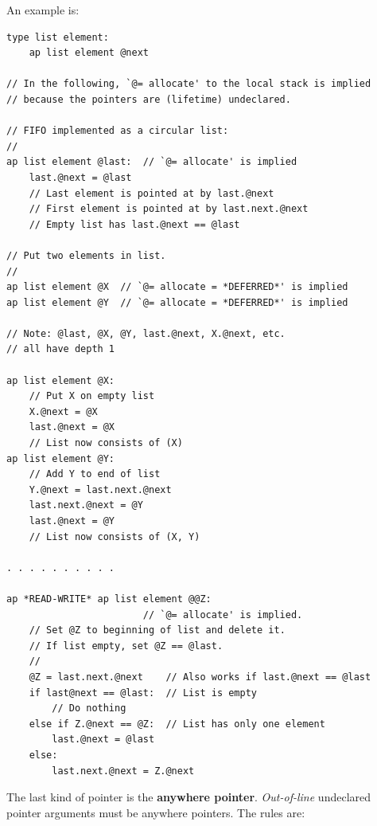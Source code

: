 \documentclass[12pt]{article}
\newcommand{\key}[1]{{\rm \bfseries #1}}
\newenvironment{indpar}[1][0.3in]%
	{\begin{list}{}%
		     {\setlength{\itemsep}{0in}%
		      \setlength{\topsep}{0in}%
		      \setlength{\parsep}{1ex}%
		      \setlength{\labelwidth}{#1}%
		      \setlength{\leftmargin}{#1}%
		      \addtolength{\leftmargin}{\labelsep}}%
	 \item}%
	{\end{list}}
\begin{document}
An example is:
\begin{indpar}\begin{verbatim}
type list element:
    ap list element @next

// In the following, `@= allocate' to the local stack is implied
// because the pointers are (lifetime) undeclared.

// FIFO implemented as a circular list:
//
ap list element @last:  // `@= allocate' is implied
    last.@next = @last
    // Last element is pointed at by last.@next
    // First element is pointed at by last.next.@next
    // Empty list has last.@next == @last

// Put two elements in list.
//
ap list element @X  // `@= allocate = *DEFERRED*' is implied
ap list element @Y  // `@= allocate = *DEFERRED*' is implied

// Note: @last, @X, @Y, last.@next, X.@next, etc.
// all have depth 1

ap list element @X:
    // Put X on empty list
    X.@next = @X
    last.@next = @X
    // List now consists of (X)
ap list element @Y:
    // Add Y to end of list
    Y.@next = last.next.@next
    last.next.@next = @Y
    last.@next = @Y
    // List now consists of (X, Y)

. . . . . . . . . .

ap *READ-WRITE* ap list element @@Z:
                        // `@= allocate' is implied.
    // Set @Z to beginning of list and delete it.
    // If list empty, set @Z == @last.
    //
    @Z = last.next.@next    // Also works if last.@next == @last
    if last@next == @last:  // List is empty
        // Do nothing
    else if Z.@next == @Z:  // List has only one element
        last.@next = @last
    else:
        last.next.@next = Z.@next
\end{verbatim}\end{indpar}

The last kind of pointer is the \key{anywhere pointer}.
{\em Out-of-line} undeclared pointer arguments
must be anywhere pointers.  The rules are:
\end{document}
